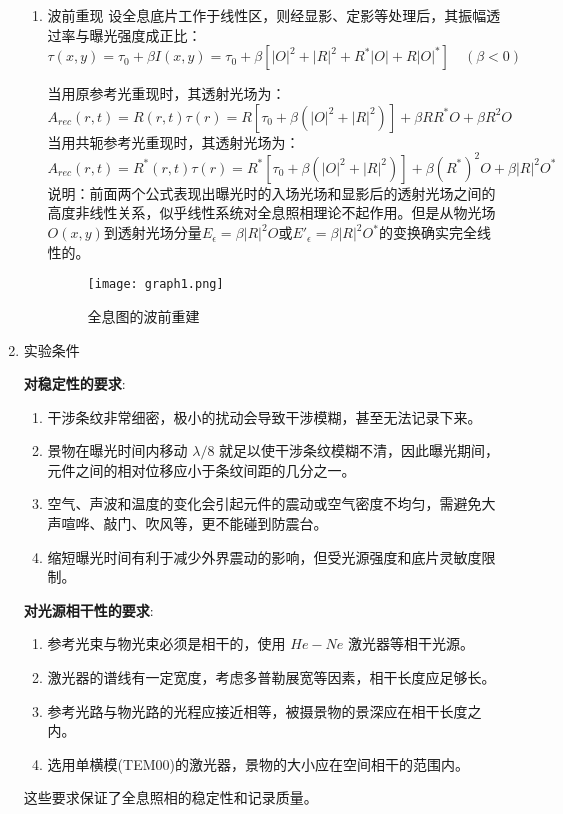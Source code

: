 \documentclass[dvipsnames, svgnames,a4paper,11pt]{article}
\begin{document}
\begin{enumerate}
\begin{enumerate}[label=\roman*.]
					\item 波前重现
					设全息底片工作于线性区，则经显影、定影等处理后，其振幅透过率与曝光强度成正比：
					\[
					\tau(x,y)=\tau_0+\beta I(x,y)=\tau_0+\beta\left[\left|O\right|^2+\left|R\right|^2+R^*\left|O\right|+R\left|O\right|^*\right]\quad (\beta<0)
					\]

					当用原参考光重现时，其透射光场为：
					\[
					A_{rec}(r,t)=R(r,t)\tau(r)=R\left[\tau_0+\beta\left(\left|O\right|^2+\left|R\right|^2\right)\right]+\beta RR^*O+\beta R^2O	
					\]
					当用共轭参考光重现时，其透射光场为：
					\[
					A_{rec}(r,t)=R^*(r,t)\tau(r)=R^*\left[\tau_0+\beta\left(\left|O\right|^2+\left|R\right|^2\right)\right]+\beta (R^*)^2O+\beta \left|R\right|^2O^*	
					\]
					说明：前面两个公式表现出曝光时的入场光场和显影后的透射光场之间的高度非线性关系，似乎线性系统对全息照相理论不起作用。但是从物光场$O(x,y)$到透射光场分量$E_\epsilon=\beta \left|R\right|^2O$或$E'_\epsilon=\beta \left|R\right|^2O^*$的变换确实完全线性的。

					\begin{figure}[htbp]
						\centering
						\texttt{[image: graph1.png]}
						\caption{全息图的波前重建}
						\label{fig:graph1}
					\end{figure}

				\end{enumerate}
			
			
			
		\item 实验条件
			
			\textbf{对稳定性的要求}:
				\begin{enumerate}[label=\roman*.]
					\item 干涉条纹非常细密，极小的扰动会导致干涉模糊，甚至无法记录下来。
					\item 景物在曝光时间内移动 $\lambda/8$ 就足以使干涉条纹模糊不清，因此曝光期间，元件之间的相对位移应小于条纹间距的几分之一。
					\item 空气、声波和温度的变化会引起元件的震动或空气密度不均匀，需避免大声喧哗、敲门、吹风等，更不能碰到防震台。
					\item 缩短曝光时间有利于减少外界震动的影响，但受光源强度和底片灵敏度限制。
				\end{enumerate}
	 
			\textbf{对光源相干性的要求}:
				\begin{enumerate}[label=\roman*.]
					\item 参考光束与物光束必须是相干的，使用 $He-Ne$ 激光器等相干光源。
					\item 激光器的谱线有一定宽度，考虑多普勒展宽等因素，相干长度应足够长。
					\item 参考光路与物光路的光程应接近相等，被摄景物的景深应在相干长度之内。
					\item 选用单横模(TEM00)的激光器，景物的大小应在空间相干的范围内。
				\end{enumerate}

			 这些要求保证了全息照相的稳定性和记录质量。

	\end{enumerate}
\end{document}

